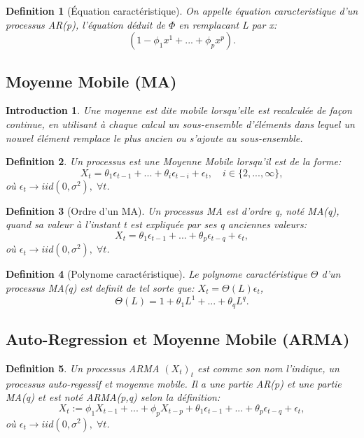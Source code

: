 \documentclass{article}
\newtheorem{intro}{Introduction}[section]
\newtheorem{definition}{Definition}[section]
\begin{document}
\begin{definition}[Équation caractéristique]
On appelle équation caracteristique d'un processus AR(p), l'équation déduit de $\Phi$ en remplacant L par x:
$$(1-\phi_1{x^1}+...+\phi_p{x^p}).$$\end{definition}

\subsection{Moyenne Mobile (MA)}

\begin{intro}
Une moyenne est dite mobile lorsqu'elle est recalculée de façon continue, en utilisant à chaque calcul un sous-ensemble d'éléments dans lequel un nouvel élément remplace le plus ancien ou s'ajoute au sous-ensemble. 
\end{intro}

\begin{definition}
Un processus est une Moyenne Mobile lorsqu'il est de la forme:
$$X_t=\theta_1{\epsilon_{t-1}}+...+\theta_i{\epsilon_{t-i}}+\epsilon_t, \quad i\in\{2,...,\infty\},$$
où $\epsilon_t \rightarrow iid(0,\sigma^2), \; \forall t$.
\end{definition}

\begin{definition}[Ordre d'un MA]
Un processus MA est d'ordre q, noté MA(q), quand sa valeur à l'instant t est expliquée par ses q anciennes valeurs: 
$$X_t=\theta_1{\epsilon_{t-1}}+...+\theta_p{\epsilon_{t-q}}+\epsilon_t,$$
où $\epsilon_t \rightarrow iid(0,\sigma^2), \; \forall t$.
\end{definition}

\begin{definition}[Polynome caractéristique]
Le polynome caractéristique $\Theta$ d'un processus MA(q) est definit de tel sorte que: $X_t=\Theta(L)\epsilon_t$,
$$\Theta(L)=1+\theta_1{L^1}+...+\theta_q{L^q}.$$
\end{definition}

\subsection{Auto-Regression et Moyenne Mobile (ARMA)}

\begin{definition}
Un processus ARMA $(X_t)_t$ est comme son nom l'indique, un processus auto-regessif et moyenne mobile. Il a une partie AR(p) et une partie MA(q) et est noté ARMA(p,q) selon la définition:
$$X_t:=\phi_1{X_{t-1}}+...+\phi_p{X_{t-p}}+\theta_1{\epsilon_{t-1}}+...+\theta_p{\epsilon_{t-q}}+\epsilon_t,$$
où $\epsilon_t \rightarrow iid(0,\sigma^2), \; \forall t$.
\end{definition}
\end{document}
